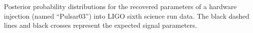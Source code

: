 \label{fig:hwinj03}
Posterior probability distributions for the recovered parameters of a hardware injection (named ``Pulsar03'')
into LIGO sixth science run data. The black dashed lines and black crosses represent the expected signal
parameters.
